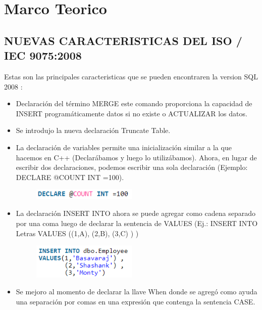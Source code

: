 \documentclass[preprint,12pt]{elsarticle}
\begin{document}
	

\section{Marco Teorico}
	
\subsection{NUEVAS CARACTERISTICAS DEL ISO / IEC 9075:2008}	

Estas son las principales caracteristicas que se pueden encontraren la version SQL 2008 :

\begin{itemize}
\item Declaración del término MERGE este comando proporciona la capacidad de INSERT programáticamente datos si no existe o ACTUALIZAR los datos.
\item Se introdujo la nueva declaración Truncate Table.
\item La declaración de variables permite una inicialización similar a la que hacemos en C++ (Declarábamos y luego lo utilizábamos). Ahora, en lugar de escribir dos declaraciones, podemos escribir una sola declaración (Ejemplo: DECLARE @COUNT INT =100).
\begin{figure}[htb]
	\begin{center}
		\includegraphics[width=5cm]{./IMAGENES/huichi1}
	\end{center}
\end{figure}
\item La declaración INSERT INTO ahora se puede agregar como cadena separado por una coma luego de declarar la sentencia de VALUES (Ej.: INSERT INTO Letras VALUES ((1,A), (2,B), (3,C) ) )
\begin{figure}[htb]
	\begin{center}
		\includegraphics[width=5cm]{./IMAGENES/huichi2}
	\end{center}
\end{figure}
\item Se mejoro al momento de declarar la llave When donde se agregó como ayuda una separación por comas en una expresión que contenga la sentencia CASE.

\end{itemize}
\end{document}
